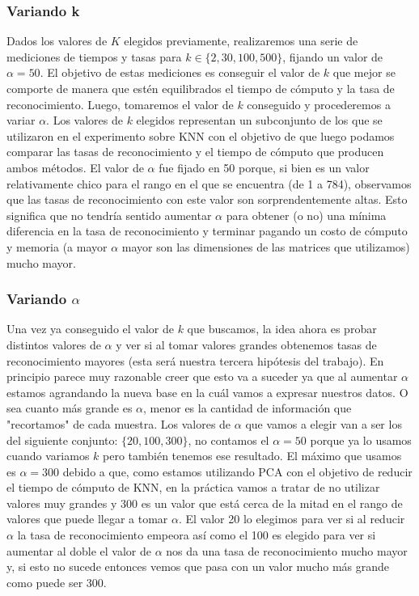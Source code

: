 \subsubsection{Variando k}
Dados los valores de $K$ elegidos previamente, realizaremos una serie de mediciones de tiempos y tasas para $k \in \{2, 30, 100, 500\}$, fijando un valor de $\alpha = 50$. El objetivo de estas mediciones es conseguir el valor de $k$ que mejor se comporte de manera que estén equilibrados el tiempo de cómputo y la tasa de reconocimiento. Luego, tomaremos el valor de $k$ conseguido y procederemos a variar $\alpha$. Los valores de $k$ elegidos representan un subconjunto de los que se utilizaron en el experimento sobre KNN con el objetivo de que luego podamos comparar las tasas de reconocimiento y el tiempo de cómputo que producen ambos métodos. El valor de $\alpha$ fue fijado en 50 porque, si bien es un valor relativamente chico para el rango en el que se encuentra (de 1 a 784), observamos que las tasas de reconocimiento con este valor son sorprendentemente altas. Esto significa que no tendría sentido aumentar $\alpha$ para obtener (o no) una mínima diferencia en la tasa de reconocimiento y terminar pagando un costo de cómputo y memoria (a mayor $\alpha$ mayor son las dimensiones de las matrices que utilizamos) mucho mayor.
\subsubsection{Variando $\alpha$}
Una vez ya conseguido el valor de $k$ que buscamos, la idea ahora es probar distintos valores de $\alpha$ y ver si al tomar valores grandes obtenemos tasas de reconocimiento mayores (esta será nuestra tercera hipótesis del trabajo). En principio parece muy razonable creer que esto va a suceder ya que al aumentar $\alpha$ estamos agrandando la nueva base en la cuál vamos a expresar nuestros datos. O sea cuanto más grande es $\alpha$, menor es la cantidad de información que "recortamos" de cada muestra. Los valores de $\alpha$ que vamos a elegir van a ser los del siguiente conjunto: $\{20, 100, 300\}$, no contamos el $\alpha = 50$ porque ya lo usamos cuando variamos $k$ pero también tenemos ese resultado. El máximo que usamos es $\alpha = 300$ debido a que, como estamos utilizando PCA con el objetivo de reducir el tiempo de cómputo de KNN, en la práctica vamos a tratar de no utilizar valores muy grandes y 300 es un valor que está cerca de la mitad en el rango de valores que puede llegar a tomar $\alpha$. El valor 20 lo elegimos para ver si al reducir $\alpha$ la tasa de reconocimiento empeora así como el 100 es elegido para ver si aumentar al doble el valor de $\alpha$ nos da una tasa de reconocimiento mucho mayor y, si esto no sucede entonces vemos que pasa con un valor mucho más grande como puede ser 300.

